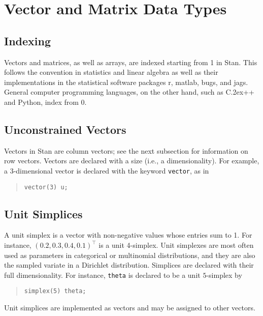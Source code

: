 \documentclass[10pt]{report}
\newcommand{\Stan}{Stan\xspace}
\newcommand*{\Cpp}{C\raise.2ex\hbox{\footnotesize ++}\xspace} %
\newcommand{\acronym}[1]{{\sc #1}\xspace}
\newcommand{\MATLAB}{\acronym{matlab}}
\newcommand{\R}{\acronym{r}}
\newcommand{\BUGS}{\acronym{bugs}}
\newcommand{\JAGS}{\acronym{jags}}
\newcommand{\code}[1]{{\tt #1}}
\begin{document}
\section{Vector and Matrix Data Types}

\subsection{Indexing}

Vectors and matrices, as well as arrays, are indexed starting from 1
in \Stan.  This follows the convention in statistics and linear
algebra as well as their implementations in the statistical software
packages \R, \MATLAB, \BUGS, and \JAGS.  General computer programming
languages, on the other hand, such as \Cpp and Python, index from 0.


\subsection{Unconstrained Vectors}

Vectors in \Stan are column vectors; see the next subsection for
information on row vectors.  Vectors are declared with a size (i.e., a
dimensionality).  For example, a 3-dimensional vector is declared with
the keyword \code{vector}, as in 
%
\begin{quote}
\begin{Verbatim}
vector(3) u;
\end{Verbatim}
\end{quote}
%

\subsection{Unit Simplices}

A unit simplex is a vector with non-negative values whose entries sum
to 1.  For instance, $(0.2,0.3,0.4,0.1)^{\top}$ is a unit 4-simplex.
Unit simplexes are most often used as parameters in categorical
or multinomial distributions, and they are also the sampled variate in
a Dirichlet distribution.  Simplices are declared with their full
dimensionality.  For instance, \code{theta} is declared to
be a unit $5$-simplex by
%
\begin{quote}
\begin{Verbatim} 
simplex(5) theta;
\end{Verbatim}
\end{quote}
% 

Unit simplices are implemented as vectors and may be assigned to other
vectors.  
\end{document}

